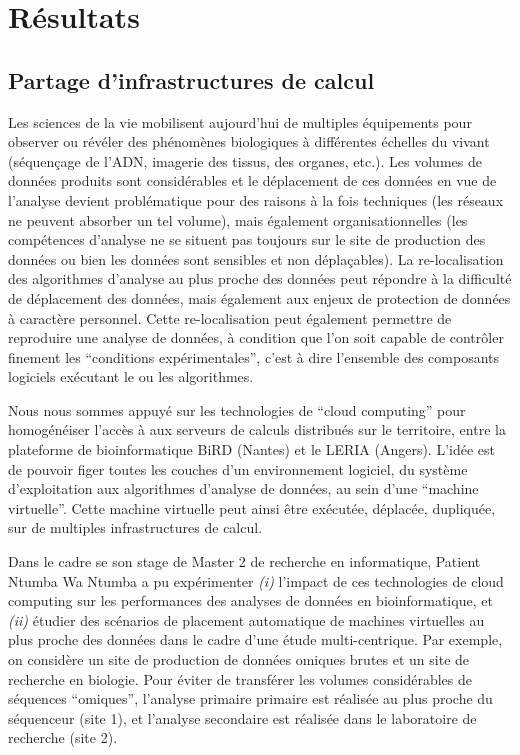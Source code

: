 \documentclass[a4paper,10pt]{article}
\theoremstyle{definition}
\begin{document}
\section{Résultats}
\subsection{Partage d'infrastructures de calcul}
Les sciences de la vie mobilisent aujourd'hui de multiples équipements pour observer ou révéler des phénomènes biologiques à différentes échelles du vivant (séquençage de l'ADN, imagerie des tissus, des organes, etc.). Les volumes de données produits sont considérables et le déplacement de ces données en vue de l'analyse devient problématique pour des raisons à la fois techniques (les réseaux ne peuvent absorber un tel volume), mais également organisationnelles (les compétences d'analyse ne se situent pas toujours sur le site de production des données ou bien les données sont sensibles et non déplaçables). La re-localisation des algorithmes d'analyse au plus proche des données peut répondre à la difficulté de déplacement des données, mais également aux enjeux de protection de données à caractère personnel. Cette re-localisation peut également permettre de reproduire une analyse de données, à condition que l'on soit capable de contrôler finement les ``conditions expérimentales'', c'est à dire l'ensemble des composants logiciels exécutant le ou les algorithmes. 

Nous nous sommes appuyé sur les technologies de ``cloud computing'' pour homogénéiser l'accès à aux serveurs de calculs distribués sur le territoire, entre la plateforme de bioinformatique BiRD (Nantes) et le LERIA (Angers). L'idée est de pouvoir figer toutes les couches d'un environnement logiciel, du système d'exploitation aux algorithmes d'analyse de données, au sein d'une ``machine virtuelle''. Cette machine virtuelle peut ainsi être exécutée, déplacée, dupliquée, sur de multiples infrastructures de calcul. 

Dans le cadre se son stage de Master 2 de recherche en informatique, Patient Ntumba Wa Ntumba a pu expé\-ri\-men\-ter {\em (i)} l'impact de ces technologies de cloud computing sur les performances des analyses de données en bioinformatique, et {\em (ii)} étudier des scénarios de placement automatique de machines virtuelles au plus proche des données dans le cadre d'une étude multi-centrique. Par exemple, on considère un site de production de données omiques brutes et un site de recherche en biologie. Pour éviter de transférer les volumes considérables de séquences ``omiques'', l'analyse primaire primaire est réalisée au plus proche du séquenceur (site 1), et l'analyse secondaire est réalisée dans le laboratoire de recherche (site 2).
\end{document}
